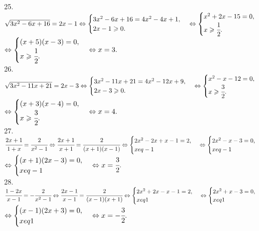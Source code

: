 25. $\sqrt{3x^2-6x+16}=2x-1\Leftrightarrow\begin{cases} 3x^2-6x+16=4x^2-4x+1,\\ 2x-1\geqslant0.\end{cases}
\Leftrightarrow\begin{cases} x^2+2x-15=0,\\ x\geqslant\cfrac{1}{2}.\end{cases}$\\$
\Leftrightarrow\begin{cases} (x+5)(x-3)=0,\\ x\geqslant\cfrac{1}{2}.\end{cases}
\Leftrightarrow x=3.$\\
26. $\sqrt{3x^2-11x+21}=2x-3\Leftrightarrow\begin{cases} 3x^2-11x+21=4x^2-12x+9,\\ 2x-3\geqslant0.\end{cases}
\Leftrightarrow\begin{cases} x^2-x-12=0,\\ x\geqslant\cfrac{3}{2}.\end{cases}$\\$
\Leftrightarrow\begin{cases} (x+3)(x-4)=0,\\ x\geqslant\cfrac{3}{2}.\end{cases}
\Leftrightarrow x=4.$\\
27. $\cfrac{2x+1}{1+x}=\cfrac{2}{x^2-1}\Leftrightarrow\cfrac{2x+1}{x+1}=\cfrac{2}{(x+1)(x-1)}\Leftrightarrow \begin{cases} 2x^2-2x+x-1=2,\\ x
eq-1\end{cases}
\Leftrightarrow \begin{cases} 2x^2-x-3=0,\\ x
eq-1\end{cases}$\\$\Leftrightarrow \begin{cases} (x+1)(2x-3)=0,\\ x
eq-1\end{cases}\Leftrightarrow x=\cfrac{3}{2}.$\\
28. $\cfrac{1-2x}{x-1}=-\cfrac{2}{x^2-1}\Leftrightarrow\cfrac{2x-1}{x-1}=\cfrac{2}{(x-1)(x+1)}\Leftrightarrow \begin{cases} 2x^2+2x-x-1=2,\\ x
eq1\end{cases}
\Leftrightarrow \begin{cases} 2x^2+x-3=0,\\ x
eq1\end{cases}$\\$\Leftrightarrow \begin{cases} (x-1)(2x+3)=0,\\ x
eq1\end{cases}\Leftrightarrow x=-\cfrac{3}{2}.$\\
